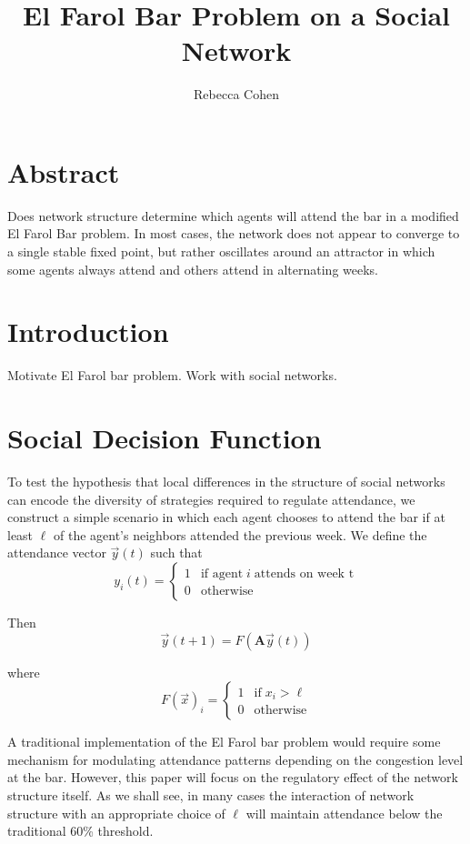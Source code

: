 \documentclass[12pt]{article}
\title{El Farol Bar Problem on a Social Network}
\author{Rebecca Cohen}
\begin{document}
\maketitle
\section{Abstract}
Does network structure determine which agents will attend the bar in a modified El Farol Bar problem.  In most cases, the network does not appear to converge to a single stable fixed point, but rather oscillates around an attractor in which some agents always attend and others attend in alternating weeks.  

\section{Introduction}
Motivate El Farol bar problem.  Work with social networks.

\section{Social Decision Function}
To test the hypothesis that local differences in the structure of social networks can encode the diversity of strategies required to regulate attendance, we construct a simple scenario in which each agent chooses to attend the bar if at least $\ell$ of the agent's neighbors attended the previous week.  We define the attendance vector $\vec{y}(t)$ such that
\begin{equation}
  y_i(t) = \begin{cases}
    1 &\text{if agent}\; i \; \text{attends on week t} \\
    0 &\text{otherwise}
  \end{cases}
\end{equation}

Then 
\begin{equation}
  \vec{y}(t + 1) = F(\mathbf{A}\vec{y}(t))
\end{equation}

where
\begin{equation}
  F(\vec{x})_i = \begin{cases}
    1 &\text{if} \; x_i > \ell \\
    0 &\text{otherwise}
  \end{cases}
\end{equation}

A traditional implementation of the El Farol bar problem would require some mechanism for modulating attendance patterns depending on the congestion level at the bar.  However, this paper will focus on the regulatory effect of the network structure itself.  As we shall see, in many cases the interaction of network structure with an appropriate choice of $\ell$ will maintain attendance below the traditional 60\% threshold. 
\end{document}
